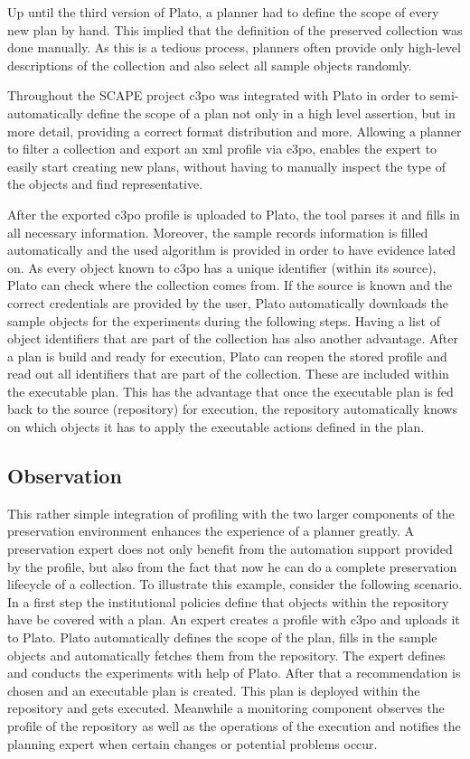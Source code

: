 Up until the third version of Plato, a planner had to define the scope of every new plan by hand. This implied that the definition of the preserved collection was done manually. As this is a tedious process, planners often provide only high-level descriptions of the collection and also select all sample objects randomly.

Throughout the SCAPE project c3po was integrated with Plato in order to semi-automatically define the scope of a plan not only in a high level assertion, but in more detail, providing a correct format distribution and more.
Allowing a planner to filter a collection and export an xml profile via c3po, enables the expert to easily start creating new plans, without having to manually inspect the type of the objects and find representative.

After the exported c3po profile is uploaded to Plato, the tool parses it and fills in all necessary information. Moreover, the sample records information is filled automatically and the used algorithm is provided in order to have evidence lated on.
As every object known to c3po has a unique identifier (within its source), Plato can check where the collection comes from. If the source is known and the correct credentials are provided by the user, Plato automatically downloads the sample objects for the experiments during the following steps.
Having a list of object identifiers that are part of the collection has also another advantage. After a plan is build and ready for execution, Plato can reopen the stored profile and read out all identifiers that are part of the collection. These are included within the executable plan. This has the advantage that once the executable plan is fed back to the source (repository) for execution, the repository automatically knows on which objects it has to apply the executable actions defined in the plan.

\subsection{Observation}
This rather simple integration of profiling with the two larger components of the preservation environment  enhances the experience of a planner greatly. A preservation expert does not only benefit from the automation support provided by the profile, but also from the fact that now he can do a complete preservation lifecycle of a collection. To illustrate this example, consider the following scenario. In a first step the institutional policies define that objects within the repository have be covered with a plan. An expert creates a profile with c3po and uploads it to Plato. Plato automatically defines the scope of the plan, fills in the sample objects and automatically fetches them from the repository. The expert defines and conducts the experiments with help of Plato. After that a recommendation is chosen and an executable plan is created. This plan is deployed within the repository and gets executed. Meanwhile a monitoring component observes the profile of the repository as well as the operations of the execution and notifies the planning expert when certain changes or potential problems occur.
